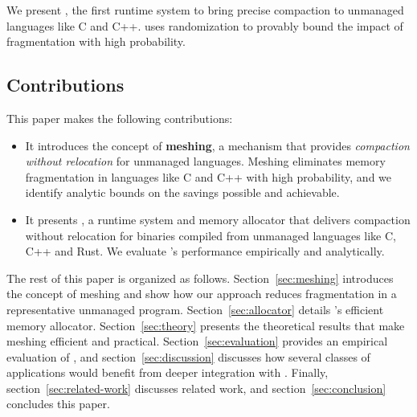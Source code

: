 We present \Mesh, the first runtime system to bring precise compaction
to unmanaged languages like C and C++.  \Mesh uses randomization to
provably bound the impact of fragmentation with high probability.

\subsection{Contributions}
\label{sec:contributions}

This paper makes the following contributions:

\begin{itemize}
\item It introduces the concept of \textbf{meshing}, a mechanism that
  provides \textit{compaction without relocation} for unmanaged
  languages.  Meshing eliminates memory fragmentation in languages
  like C and C++ with high probability, and we identify analytic
  bounds on the savings possible and achievable.
\item It presents \textbf{\Mesh}, a runtime system and memory
  allocator that delivers compaction without relocation for binaries
  compiled from unmanaged languages like C, C++ and Rust.  We evaluate
  \Mesh's performance empirically and analytically.
\end{itemize}

The rest of this paper is organized as follows.
Section~\ref{sec:meshing} introduces the concept of meshing and show
how our approach reduces fragmentation in a representative unmanaged
program.  Section~\ref{sec:allocator} details \Mesh's efficient memory
allocator.  Section~\ref{sec:theory} presents the theoretical results
that make meshing efficient and
practical. Section~\ref{sec:evaluation} provides an empirical
evaluation of \Mesh, and section~\ref{sec:discussion} discusses how
several classes of applications would benefit from deeper integration
with \Mesh.  Finally, section~\ref{sec:related-work} discusses related work, and
section~\ref{sec:conclusion} concludes this paper.
